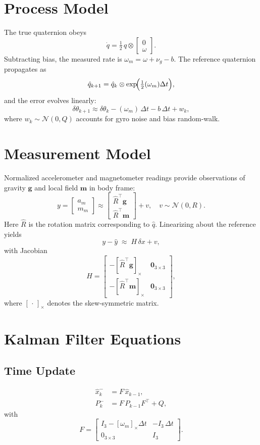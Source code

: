 \documentclass[12pt]{article}
\begin{document}
\section{Process Model}
The true quaternion obeys
\[
\dot q = \tfrac12\,q\otimes\begin{bmatrix}0\\\omega\end{bmatrix}.
\]
Subtracting bias, the measured rate is \(\omega_m = \omega + \nu_g - b\).  The reference quaternion propagates as
\[
\hat q_{k+1} = \hat q_k \otimes \exp\!\Bigl(\tfrac12(\omega_m)\Delta t\Bigr),
\]
and the error evolves linearly:
\[
\delta\theta_{k+1} \approx \delta\theta_k - (\omega_m)\,\Delta t - b\,\Delta t + w_k,
\]
where \(w_k\sim\mathcal{N}(0,Q)\) accounts for gyro noise and bias random‐walk.

\section{Measurement Model}
Normalized accelerometer and magnetometer readings provide observations of gravity \(\mathbf{g}\) and local field \(\mathbf{m}\) in body frame:
\[
y = \begin{bmatrix}a_m\\m_m\end{bmatrix}
\approx \begin{bmatrix}\hat R^\top\mathbf{g}\\\hat R^\top\mathbf{m}\end{bmatrix} + v,\quad v\sim\mathcal{N}(0,R).
\]
Here \(\hat R\) is the rotation matrix corresponding to \(\hat q\).  Linearizing about the reference yields
\[
y - \hat y \;\approx\; H\,\delta x + v,
\]
with Jacobian
\[
H = \begin{bmatrix}
-[\hat R^\top\mathbf{g}]_\times & \mathbf{0}_{3\times3}\\
-[\hat R^\top\mathbf{m}]_\times & \mathbf{0}_{3\times3}
\end{bmatrix},
\]
where \([\,\cdot\,]_\times\) denotes the skew‐symmetric matrix.

\section{Kalman Filter Equations}
\subsection{Time Update}
\begin{align*}
\hat x^-_k &= F\,\hat x_{k-1},\\
P^-_k &= F\,P_{k-1}F^\top + Q,
\end{align*}
with 
\[
F = \begin{bmatrix}
I_3 - [\omega_m]_\times\Delta t & -I_3\,\Delta t\\
0_{3\times3} & I_3
\end{bmatrix}.
\]
\end{document}
